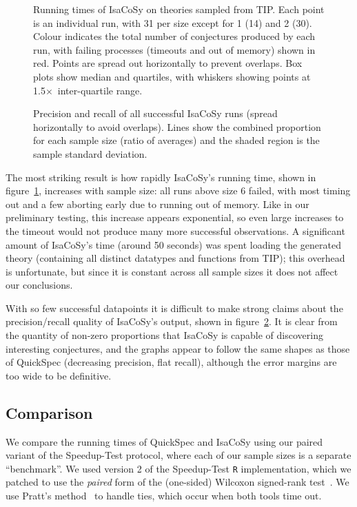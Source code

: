 \begin{figure}
  \centering
  
  \caption{Running times of IsaCoSy on theories sampled from TIP. Each point
    is an individual run, with 31 per size except for 1 (14) and 2 (30). Colour
    indicates the total number of conjectures produced by each run, with failing
    processes (timeouts and out of memory) shown in red. Points are spread out
    horizontally to prevent overlaps. Box plots show median and quartiles, with
    whiskers showing points at 1.5$\times$~inter-quartile range.}
  \label{figure:isacosy_runtimes}
\end{figure}

\begin{figure}
  \centering
  
  \caption{Precision and recall of all successful IsaCoSy runs (spread
    horizontally to avoid overlaps). Lines show the combined proportion for each
    sample size (ratio of averages) and the shaded region is the sample standard
    deviation.}
  \label{figure:isacosy_precRec}
\end{figure}

The most striking result is how rapidly IsaCoSy's running time, shown in
figure~\ref{figure:isacosy_runtimes}, increases with sample size: all runs above
size 6 failed, with most timing out and a few aborting early due to running out
of memory. Like in our preliminary testing, this increase appears exponential,
so even large increases to the timeout would not produce many more successful
observations. A significant amount of IsaCoSy's time (around 50 seconds) was
spent loading the generated theory (containing all distinct datatypes and
functions from TIP); this overhead is unfortunate, but since it is constant
across all sample sizes it does not affect our conclusions.

With so few successful datapoints it is difficult to make strong claims about
the precision/recall quality of IsaCoSy's output, shown in
figure~\ref{figure:isacosy_precRec}. It is clear from the quantity of non-zero
proportions that IsaCoSy is capable of discovering interesting conjectures, and
the graphs appear to follow the same shapes as those of QuickSpec (decreasing
precision, flat recall), although the error margins are too wide to be
definitive.

\subsection{Comparison}

We compare the running times of QuickSpec and IsaCoSy using our paired variant
of the Speedup-Test protocol, where each of our sample sizes is a separate
``benchmark''. We used version 2 of the Speedup-Test \texttt{R} implementation,
which we patched to use the \emph{paired} form of the (one-sided) Wilcoxon
signed-rank test~\cite{wilcoxon1945individual}. We use Pratt's
method~\cite{pratt1959remarks} to handle ties, which occur when both tools time
out.

